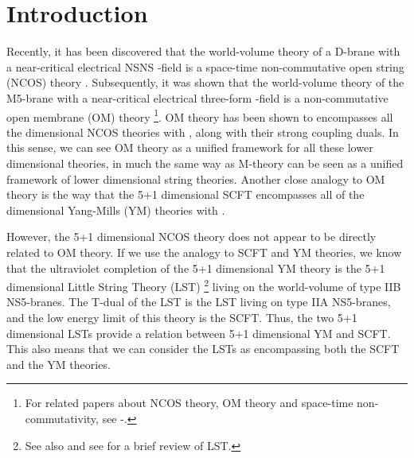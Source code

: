 \documentclass[a4paper,twoside,titlepage,12pt]{article}
\begin{document}
\providecommand{\ym}{\myHighlight{${\rm YM}_{4+1}$}\coordHE{}}
\providecommand{\ymm}{\myHighlight{${\rm YM}_{5+1}$}\coordHE{}}
\providecommand{\ncos}{\myHighlight{${\rm NCOS}_{4+1}$}\coordHE{}}
\providecommand{\ncoss}{\myHighlight{${\rm NCOS}_{5+1}$}\coordHE{}}



\setcounter{page}{1}

\tableofcontents

\section{Introduction}


Recently, it has been discovered that the world-volume theory of
a D\coordHE{}-brane with a near-critical electrical NSNS \coordHE{}-field is a space-time
non-commutative open string (NCOS) theory 
\cite{Seiberg:2000ms,Gopakumar:2000na}. 
Subsequently, it was shown that the world-volume theory of the
M5-brane with a near-critical electrical three-form \coordHE{}-field is
a non-commutative open membrane (OM) theory 
\cite{Gopakumar:2000ep,Bergshoeff:2000ai}%
\footnote{For related papers about NCOS theory, OM theory and
space-time non-commutativity, see 
\cite{Seiberg:2000gc}-\cite{Cai:2000yk}.}.
OM theory has been shown 
\cite{Gopakumar:2000ep,Bergshoeff:2000ai,Kawano:2000gn} 
to encompasses all the \coordHE{} dimensional
NCOS theories with \coordHE{}, along with their strong coupling
duals. In this sense, we can see OM theory as a unified framework
for all these lower dimensional theories, in much the same way
as M-theory can be seen as a unified framework of lower dimensional
string theories.
Another close analogy to OM theory is the way that the 5+1 dimensional
\coordHE{} SCFT encompasses all of the \coordHE{} dimensional Yang-Mills (YM) 
theories with \coordHE{}.

However, the 5+1 dimensional NCOS theory does not appear to be directly
related to OM theory. 
If we use the analogy to \coordHE{} SCFT and YM theories, we know
that the ultraviolet completion of the 5+1 dimensional YM theory 
is the 5+1 dimensional \coordHE{} Little String Theory (LST) 
\cite{Berkooz:1997cq,Seiberg:1997zk}%
\footnote{See also \cite{Dijkgraaf:1997hk,Dijkgraaf:1997nb,Losev:1997hx} and 
see \cite{Aharony:1999ks} for a brief review of LST.}
living on the world-volume of type IIB NS5-branes. 
The T-dual of the \coordHE{} LST is the \coordHE{} LST living on type IIA 
NS5-branes, and the low energy limit of this theory is the 
\coordHE{} SCFT. Thus, the two 5+1 dimensional LSTs provide a relation
between 5+1 dimensional YM and \coordHE{} SCFT.
This also means that we can consider the LSTs as encompassing
both the \coordHE{} SCFT and the YM theories.
\end{document}
